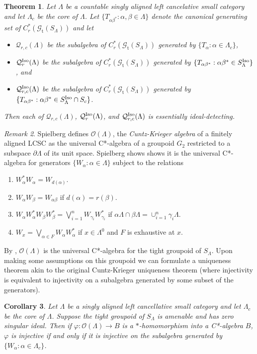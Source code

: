 \documentclass[12pt]{amsart}
\newtheorem{thm}{Theorem}[section]
\newtheorem{cor}[thm]{Corollary}
\theoremstyle{definition}
\theoremstyle{remark}
\newtheorem{remark}[thm]{Remark}
\numberwithin{equation}{section}
\newcommand{\Q}{\mathcal{Q}}
\newcommand{\cO}{\mathcal{O}}
\renewcommand{\L}{\Lambda}
\renewcommand{\a}{\alpha}
\renewcommand{\b}{\beta}
\newcommand{\gt}{\mathcal{G}_{\text{t}}}
\newcommand{\vp}{\varphi}
\newcommand{\Iso}{\textup{Iso}}
\newcommand{\ga}{\gamma}
\begin{document}
	\begin{thm}\label{thm:main_theorem_sa}
		Let $\L$ be a countable singly aligned left cancelative small category and let $\L_c$ be the core of $\L$. Let $\{T_{\a\b^*}:\a,\b\in\L\}$ denote the canonical generating set of $C^*_r(\gt(S_\L))$ and let 
		\begin{itemize}
			\item $\Q_{r,c}(\L)$ be the subalgebra of $C^*_r(\gt(S_\L))$ generated by $\{T_{\a}:\a \in\L_c\}$,
			\item $\Q_{r}^\Iso(\L)$ be the subalgebra of $C^*_r(\gt(S_\L))$ generated by $\{T_{\a\b^*}:\a\b^*\in S_\L^\Iso\}$, 	 and
		\item $\Q_{r,c}^\Iso(\L)$ be the subalgebra of $C^*_r(\gt(S_\L))$ generated by $\{T_{\a\b^*}:\a\b^*\in S_\L^\Iso\cap S_c\}$.
		\end{itemize}
		Then each of $\Q_{r,c}(\L)$, $\Q_{r}^\Iso(\L)$, and $\Q_{r,c}^\Iso(\L)$ is essentially ideal-detecting.
	\end{thm}
	
	\begin{remark}\label{rmk:CK_LCSC}
	Spielberg defines $\cO(\L)$, the {\em Cuntz-Krieger algebra} of a finitely aligned LCSC as the universal C*-algebra of a groupoid $G_2$ restricted to a subspace $\partial\L$ of its unit space. Spielberg shows shows it is the universal C*-algebra for generators $\{W_\a:\a\in\L\}$ subject to the relations
	\begin{enumerate}
		\item[(S1)]\label{it1} $W_\a^*W_\a = W_{d(\a)}$.
		\item[(S2)]\label{it2} $W_\a W_\b = W_{\a\b}$ if $d(\a) = r(\b)$.
		\item[(S3)]\label{it3} $W_\a W_\a^* W_\b W_\b^* = \bigvee_{i = 1}^nW_{\ga_i} W_{\ga_i}^*$ if $\a\L\cap \b\L = \cup_{i=1}^n\ga_i\L$.
		\item[(S4)]\label{it4} $W_x = \bigvee_{\a\in F} W_\a W_\a^*$ if $x\in \L^0$ and $F$ is exhaustive at $x$. 
	\end{enumerate}
	By \cite{LiGarside1}, $\cO(\L)$ is the universal C*-algebra for the tight groupoid of $S_\L$. Upon making some assumptions on this groupoid we can formulate a uniqueness theorem akin to the original Cuntz-Krieger uniqueness theorem (where injectivity is equivalent to injectivity on a subalgebra generated by some subset of the generators). 
		\end{remark}
\begin{cor}
	Let $\L$ be a singly aligned left cancellative small category and let $\L_c$ be the core of $\L$. Suppose the tight groupoid of $S_\L$ is amenable and has zero singular ideal. Then if $\vp:\cO(\L)\to B$ is a $*$-homomorphism into a C*-algebra $B$, $\vp$ is injective if and only if it is injective on the subalgebra generated by $\{W_\a:\a\in\L_c\}$. 
\end{cor}	
\end{document}
